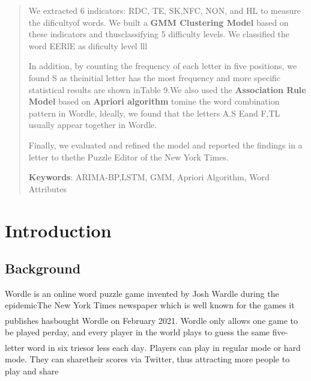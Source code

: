 \documentclass[12pt]{ctexart}
\newcommand{\upcite}[1]{\textsuperscript{\textsuperscript{\cite{#1}}}}%
\begin{document}
\begin{abstract}
	We extracted 6 indicators: RDC, TE, SK,NFC, NON, and HL to measure the dificultyof words. We built a \textbf{GMM Clustering Model} based on these indicators and thusclassifying 5 difficulty levels. We classified the word EERlE as dificulty level lll
	
	In addition, by counting the frequency of each letter in five positions, we found S as theinitial letter has the most frequency and more specific statistical results are shown inTable 9.We also used the \textbf{Association Rule Model} based on \textbf{Apriori algorithm} tomine the word combination pattern in Wordle, ldeally, we found that the letters A.S Eand F,TL usually appear together in Wordle.
	
	Finally, we evaluated and refined the model and reported the findings in a letter to thethe Puzzle Editor of the New York Times.
	
	\textbf{Keywords}: ARIMA-BP,LSTM, GMM, Apriori Algorithm, Word Attributes

\end{abstract}

\maketitle  %

\tableofcontents  %




\section{Introduction}
\subsection{Background}
Wordle is an online word puzzle game invented by Josh Wardle during the epidemicThe New York Times newspaper which is well known for the games it publishes hasbought Wordle on February 2021\upcite{1}. Wordle only allows one game to be played perday, and every player in the world plays to guess the same five-letter word in six triesor less each day\upcite{2}. Players can play in regular mode or hard mode. They can sharetheir scores via Twitter, thus attracting more people to play and share
\end{document}
